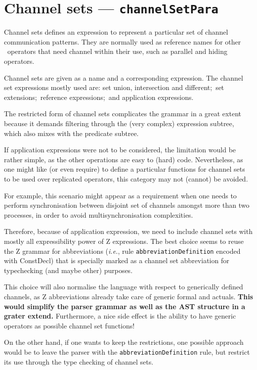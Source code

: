 \documentclass{article}
\newcommand{\grammar}[1]{\texttt{#1}}
\newcommand{\code}[1]{\textsf{#1}}
\begin{document}
\section{Channel sets --- \grammar{channelSetPara}}

Channel sets defines an expression to represent a particular set of channel
communication patterns. They are normally used as reference names for other
\Circus\ operators that need channel within their use, such as parallel and
hiding operators.

Channel sets are given as a name and a corresponding expression.
%
%
The channel set expressions mostly used are: set union, intersection and
different;~set extensions;~reference expressions;~and application expressions.

\begin{issue}
  The restricted form of channel sets complicates the grammar in a great
  extent because it demands filtering through the (very complex) expression
  subtree, which also mixes with the predicate subtree.

  If application expressions were not to be considered, the limitation would be
  rather simple, as the other operations are easy to (hard) code. Nevertheless,
  as one might like (or even require) to define a particular functions for
  channel sets to be used over replicated operators, this category may not (cannot) be
  avoided.

  For example, this scenario might appear as a requirement when one needs to perform
  synchronisation between disjoint set of channels amongst more than two processes,
  in order to avoid multisynchronisation complexities.

  Therefore, because of application expression, we need to include channel sets with mostly
  all expressibility power of Z expressions. The best choice seems to reuse the
  Z grammar for abbreviations (\textit{i.e.}, rule \grammar{abbreviationDefinition} encoded with \code{ConstDecl})
  that is specially marked as a channel set abbreviation for typechecking (and maybe other) purposes.

  This choice will also normalise the language with respect to generically
  defined channels, as Z abbreviations already take care of generic formal and
  actuals. \textbf{This would simplify the parser grammar as well as the AST structure in a grater
  extend.} Furthermore, a nice side effect is the ability to have generic
  operators as possible channel set functions!

  On the other hand, if one wants to keep the restrictions, one possible
  approach would be to leave the parser with the
  \grammar{abbreviationDefinition} rule, but restrict its use through the type
  checking of channel sets.
\end{issue}
\end{document}
